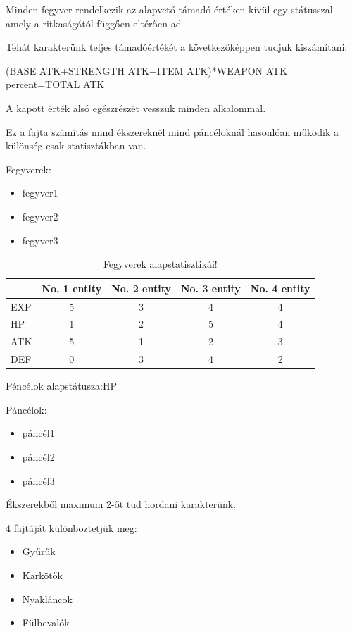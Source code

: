 Minden fegyver rendelkezik az alapvető támadó értéken kívül egy státusszal amely a ritkaságától függően eltérően ad %

Tehát karakterünk teljes támadóértékét a következőképpen tudjuk kiszámítani: 

(BASE ATK+STRENGTH ATK+ITEM ATK)*WEAPON ATK percent=TOTAL ATK

A kapott érték alsó egészrészét vesszük minden alkalommal.

Ez a fajta számítás mind ékszereknél mind páncéloknál hasonlóan működik a különség csak  statisztákban van.

Fegyverek:
\begin{itemize}
  \item fegyver1
  \item fegyver2
  \item fegyver3
\end{itemize}

\begin{table}[h]
\centering
\caption{Fegyverek alapstatisztikái!}
\label{tab:minta}
\begin{tabular}{|l|c|c|c|c|}
\hline
 & No. 1 entity & No. 2 entity & No. 3 entity & No. 4 entity  \\
\hline
EXP & 5 & 3 & 4 & 4 \\
\hline
HP & 1 & 2 & 5 & 4 \\
\hline
ATK & 5 & 1 & 2 & 3 \\
\hline
DEF & 0 & 3 & 4 & 2 \\
\hline
\end{tabular}
\end{table}

Péncélok alapstátusza:HP%

Páncélok:

\begin{itemize}
  \item páncél1
  \item páncél2
  \item páncél3
\end{itemize}



\noindent Ékszerekből maximum 2-őt tud hordani karakterünk.

4 fajtáját különböztetjük meg:

\begin{itemize}
  \item Gyűrűk
  \item Karkötők
  \item Nyakláncok
  \item Fülbevalók
\end{itemize}

